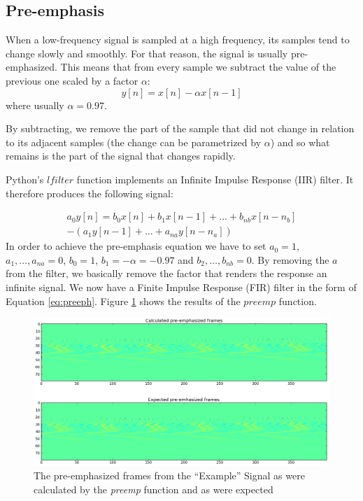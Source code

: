 \documentclass[12pt,a4paper,oneside]{article}
\begin{document}
\subsection{Pre-emphasis}
When a low-frequency signal is sampled at a high frequency, its samples tend to change slowly and smoothly. For that reason, the signal is usually pre-emphasized. This means that from every sample we subtract the value of the previous one scaled by a factor $\alpha$:
\begin{equation} \label{eq:preeph}
y[n] = x[n] - \alpha x[n - 1]
\end{equation}
where usually $\alpha = 0.97$.

By subtracting, we remove the part of the sample that did not change in relation to its adjacent samples (the change can be parametrized by $\alpha$) and so what remains is the part of the signal that changes rapidly.

Python's $lfilter$ function implements an Infinite Impulse Response (IIR) filter. It therefore produces the following signal:

\begin{equation}
\begin{split}
a_0 y[n] = b_0 x[n] + b_1 x[n-1] + \dots + b_{nb} x[n-n_b]\\
	 - (a_1 y[n-1] + \dots + a_{na} y[n-n_a])
\end{split}
\end{equation}
In order to achieve the pre-emphasis equation we have to set $a_0 = 1$, $a_1, \dots, a_{na} = 0$, $b_0 = 1$, $b_1 = -\alpha = - 0.97$ and $b_2, \dots, b_{nb} =0$. By removing the $a$ from the filter, we basically remove the factor that renders the response an infinite signal. We now have a Finite Impulse Response (FIR) filter in the form of Equation \ref{eq:preeph}. Figure \ref{fig:preemph} shows the results of the $preemp$ function.

\begin{figure}[h]
\includegraphics[scale=0.4]{../preemph.png}
\caption{The pre-emphasized frames from the ``Example'' Signal as were calculated by the \textit{preemp} function and as were expected}
\label{fig:preemph}
\end{figure}
\end{document}
